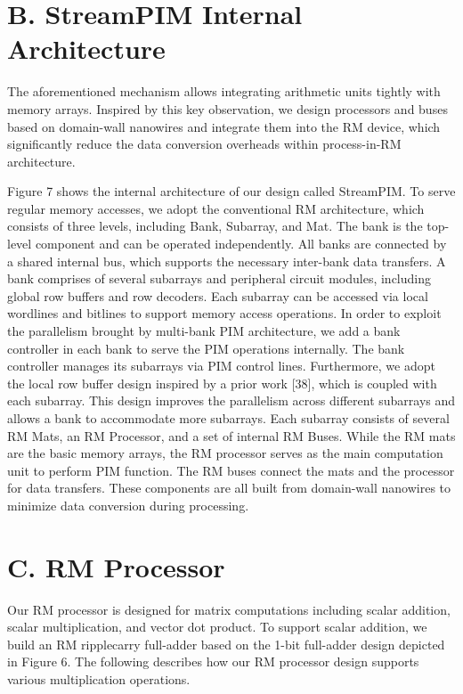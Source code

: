 \documentclass[10pt]{article}
\begin{document}
\section*{B. StreamPIM Internal Architecture}
The aforementioned mechanism allows integrating arithmetic units tightly with memory arrays. Inspired by this key observation, we design processors and buses based on domain-wall nanowires and integrate them into the RM device, which significantly reduce the data conversion overheads within process-in-RM architecture.

Figure 7 shows the internal architecture of our design called StreamPIM. To serve regular memory accesses, we adopt the conventional RM architecture, which consists of three levels, including Bank, Subarray, and Mat. The bank is the top-level component and can be operated independently. All banks are connected by a shared internal bus, which supports the necessary inter-bank data transfers. A bank comprises of several subarrays and peripheral circuit modules, including global row buffers and row decoders. Each subarray can be accessed via local wordlines and bitlines to support memory access operations. In order to exploit the parallelism brought by multi-bank PIM architecture, we add a bank controller in each bank to serve the PIM operations internally. The bank controller manages its subarrays via PIM control lines. Furthermore, we adopt the local row buffer design inspired by a prior work [38], which is coupled with each subarray. This design improves the parallelism across different subarrays and allows a bank to accommodate more subarrays. Each subarray consists of several RM Mats, an RM Processor, and a set of internal RM Buses. While the RM mats are the basic memory arrays, the RM processor serves as the main computation unit to perform PIM function. The RM buses connect the mats and the processor for data transfers. These components are all built from domain-wall nanowires to minimize data conversion during processing.

\section*{C. RM Processor}
Our RM processor is designed for matrix computations including scalar addition, scalar multiplication, and vector dot product. To support scalar addition, we build an RM ripplecarry full-adder based on the 1-bit full-adder design depicted in Figure 6. The following describes how our RM processor design supports various multiplication operations.
\end{document}
